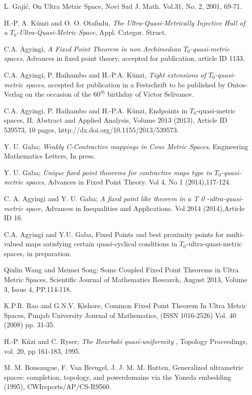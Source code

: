 \documentclass[10pt,a4paper]{article}
\begin{document}
\begin{thebibliography}{99}
 L. Gaji\'c, On Ultra Metric Space, Novi Sad J. Math. Vol.31, No. 2, 2001, 69-71.



 H.-P. A. K\"unzi and O. O. Otafudu, \emph{The Ultra-Quasi-Metrically Injective Hull of a $T_0$-Ultra-Quasi-Metric Space}, Appl. Categor. Struct.

 C.A. Agyingi,  \emph{A Fixed Point Theorem in non Archimedean $T_0$-quasi-metric spaces}, Advances in fixed point theory, accepted for publication, article ID 1133. 
  
 C.A. Agyingi, P. Haihambo and H.-P.A. K\"unzi, \emph{Tight extensions of $T_0$-quasi-metric spaces}, accepted for publication in a Festschrift to be published by Ontos-Verlag on the occasion of the $60^{th}$ birthday of Victor Selivanov.
  
 C.A. Agyingi, P. Haihambo and H.-P.A. K\"unzi, Endpoints in $T_0$-quasi-metric spaces, II, Abstract and Applied Analysis, Volume 2013 (2013), Article ID 539573, 10 pages, http://dx.doi.org/10.1155/2013/539573.

 Y. U. Gaba; \emph{Weakly C-Contractive mappings in Cone Metric Spaces}, Engineering Mathematics Letters,
In press.

 Y. U. Gaba; \emph{Unique fixed point theorems for contractive maps type in $T_0$-quasi-metric spaces}, Advances
in Fixed Point Theory. Vol 4, No 1 (2014),117-124.

 C. A. Agyingi and Y. U. Gaba; \emph{A fixed point like theorem in a T 0 -ultra-quasi-metric space}, Advances in Inequalities and Applications. Vol 2014 (2014),Article ID 16.

 C.A. Agyingi and Y.U. Gaba, Fixed Points and best proximity points for multi-valued maps satisfying certain quasi-cyclical conditions in $T_0$-ultra-quasi-metric spaces, in preparation.


 Qiulin Wang and Meimei Song;
Some Coupled Fixed Point Theorems in Ultra Metric Spaces, Scientific Journal of Mathematics Research, August 2013, Volume 3, Issue 4, PP.114-118.

 K.P.R. Rao and G.N.V. Kishore, Common Fixed Point Theorem In Ultra Metric Spaces, Punjab University Journal of Mathematics, (ISSN 1016-2526) Vol. 40 (2008) pp. 31-35.

 H.-P. K\"nzi and C. Ryser; \emph{The Bourbaki quasi-uniformity} , Topology Proceedings, vol. 20, pp 161-183, 1995.
  
 M. M. Bonsangue, F. Van Breugel, J. J. M. M. Rutten, Generalized ultrametric spaces: completion, topology, and powerdomains via the Yoneda embedding (1995), CWIreports/AP/CS-R9560.

\end{thebibliography}
\end{document}
